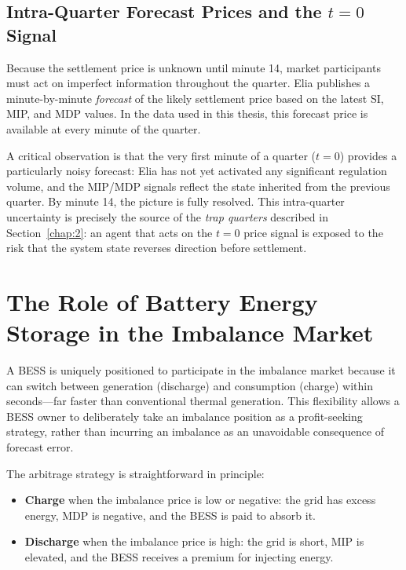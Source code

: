 \subsection{Intra-Quarter Forecast Prices and the \texorpdfstring{$t=0$}{t=0} Signal}

Because the settlement price is unknown until minute 14, market participants must act on imperfect information throughout the quarter. Elia publishes a minute-by-minute \textit{forecast} of the likely settlement price based on the latest SI, MIP, and MDP values. In the data used in this thesis, this forecast price is available at every minute of the quarter.

A critical observation is that the very first minute of a quarter ($t=0$) provides a particularly noisy forecast: Elia has not yet activated any significant regulation volume, and the MIP/MDP signals reflect the state inherited from the previous quarter. By minute 14, the picture is fully resolved. This intra-quarter uncertainty is precisely the source of the \textit{trap quarters} described in Section~\ref{chap:2}: an agent that acts on the $t=0$ price signal is exposed to the risk that the system state reverses direction before settlement.

\section{The Role of Battery Energy Storage in the Imbalance Market}
\label{sec:bess-role}

A BESS is uniquely positioned to participate in the imbalance market because it can switch between generation (discharge) and consumption (charge) within seconds—far faster than conventional thermal generation. This flexibility allows a BESS owner to deliberately take an imbalance position as a profit-seeking strategy, rather than incurring an imbalance as an unavoidable consequence of forecast error.

The arbitrage strategy is straightforward in principle:
\begin{itemize}
    \item \textbf{Charge} when the imbalance price is low or negative: the grid has excess energy, MDP is negative, and the BESS is paid to absorb it.
    \item \textbf{Discharge} when the imbalance price is high: the grid is short, MIP is elevated, and the BESS receives a premium for injecting energy.
\end{itemize}

